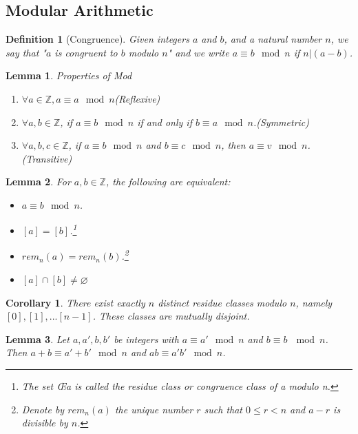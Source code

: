 \documentclass[12pt]{article}
\newtheorem{definition}{Definition}[subsection]
\newtheorem{lemma}{Lemma}[subsection]
\newtheorem{corollary}{Corollary}[subsection]
\begin{document}
\subsection{Modular Arithmetic}
    \begin{definition}[Congruence]
        Given integers $a$ and $b$, and a natural number $n$, we say that "$a$ is congruent to $b$ modulo $n$" and we write $a \equiv b \mod n$ if $n|(a-b)$.
    \end{definition}

    \begin{lemma}
        Properties of Mod
        \begin{enumerate}
            \item $\forall a \in \mathbb{Z}, a \equiv a\mod n$(Reflexive)
            \item $\forall a,b \in \mathbb{Z}$, if $a \equiv b \mod n$ if and only if $b \equiv a \mod n$.(Symmetric) 
            \item $\forall a,b,c \in \mathbb{Z}$, if $a \equiv b \mod n$ and $b \equiv c \mod n$, then $a \equiv v \mod n$.(Transitive)
        \end{enumerate}
    \end{lemma}
    
    \begin{lemma}
        For $a, b \in \mathbb{Z}$, the following are equivalent:
        \begin{itemize}
            \item $a \equiv b \mod n$.
            \item $[a] = [b]$.\footnote{The set Œa  is called the residue class or congruence class of a modulo n.}
            \item $rem_n(a) = rem_n(b)$.\footnote{Denote by $rem_n(a)$ the unique number $r$ such that $0 \leq r < n$ and $a-r$ is divisible by $n$.}
            \item $[a]\cap[b] \neq \varnothing$
        \end{itemize}
    \end{lemma}

    \begin{corollary}
        There exist exactly $n$ distinct residue classes modulo $n$, namely $[0],[1],...[n-1]$. These classes are mutually disjoint.
    \end{corollary}
    \begin{lemma}
        Let $a, a',b ,b'$ be integers with $a \equiv a' \mod n$ and $b \equiv b\ \mod n$. Then $a+b \equiv a'+b' \mod n$ and $ab \equiv a'b' \mod n$.
    \end{lemma}
\end{document}
